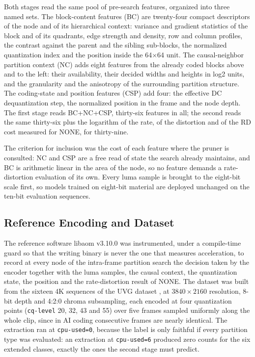 \documentclass[conference]{IEEEtran}
\begin{document}
Both stages read the same pool of pre-search features, organized into three named
sets. The block-content features (BC) are twenty-four compact descriptors of the
node and of its hierarchical context: variance and gradient statistics of the
block and of its quadrants, edge strength and density, row and column profiles,
the contrast against the parent and the sibling sub-blocks, the normalized
quantization index and the position inside the 64$\times$64 unit. The
causal-neighbor partition context (NC) adds eight features from the already coded
blocks above and to the left: their availability, their decided widths and
heights in log2 units, and the granularity and the anisotropy of the surrounding
partition structure. The coding-state and position features (CSP) add four: the
effective DC dequantization step, the normalized position in the frame and the
node depth. The first stage reads BC+NC+CSP, thirty-six features in all; the
second reads the same thirty-six plus the logarithm of the rate, of the
distortion and of the RD cost measured for NONE, for thirty-nine.

The criterion for inclusion was the cost of each feature where the pruner is
consulted: NC and CSP are a free read of state the search already maintains, and
BC is arithmetic linear in the area of the node, so no feature demands a
rate-distortion evaluation of its own. Every luma sample is brought to the
eight-bit scale first, so models trained on eight-bit material are deployed
unchanged on the ten-bit evaluation sequences.

\subsection{Reference Encoding and Dataset}
\label{sec_data}

The reference software libaom v3.10.0 was instrumented, under a compile-time
guard so that the writing binary is never the one that measures acceleration, to
record at every node of the intra-frame partition search the decision taken by
the encoder together with the luma samples, the causal context, the quantization
state, the position and the rate-distortion result of NONE. The dataset was built
from the sixteen 4K sequences of the UVG dataset \cite{uvg}, at
$3840\times2160$ resolution, 8-bit depth and 4:2:0 chroma subsampling, each
encoded at four quantization points (\texttt{cq-level} 20, 32, 43 and 55) over
five frames sampled uniformly along the whole clip, since in AI coding
consecutive frames are nearly identical. The extraction ran at
\texttt{cpu-used=0}, because the label is only faithful if every partition type
was evaluated: an extraction at \texttt{cpu-used=6} produced zero counts for the
six extended classes, exactly the ones the second stage must predict.
\end{document}
